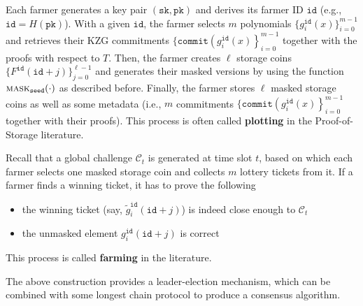 \documentclass[12pt,draftcls,onecolumn]{IEEEtran}
\newcommand{\sk}{\texttt{sk}}
\newcommand{\pk}{\texttt{pk}}
\newcommand{\id}{\texttt{id}}
\newcommand{\seed}{\texttt{seed}}
\newcommand{\cmt}{\texttt{commit}}
\newcommand{\mask}{\textsc{mask}}
\begin{document}
Each farmer generates a key pair $(\sk, \pk)$ and derives its farmer ID $\id$ (e.g., $\id = H(\pk)$).
With a given $\id$, the farmer selects $m$ polynomials $\{g_i^{\id}(x) \}_{i = 0}^{m - 1}$ and retrieves their KZG commitments $\{\cmt\left(g_i^{\id}(x) \right \}_{i = 0}^{m - 1}$
together with the proofs with respect to $T$. Then, the farmer creates $\ell$ storage coins 
$\{ F^{\id}(\id + j) \}_{j = 0}^{\ell - 1}$ and generates their masked versions by using the function $\mask_{\seed}(\cdot)$ as described before.
Finally, the farmer stores $\ell$ masked storage coins as well as some metadata (i.e., $m$ commitments $\{\cmt\left(g_i^{\id}(x) \right \}_{i = 0}^{m - 1}$ together with their proofs).
This process is often called {\bf plotting} in the Proof-of-Storage literature.

Recall that a global challenge $\mathcal{C}_t$ is generated at time slot $t$, based on which each farmer selects one masked storage coin and collects $m$ lottery tickets from it. If a farmer finds a winning ticket, it has to prove the following
\begin{itemize}
    \item the winning ticket (say, $\tilde{g}_i^{\id}(\id + j)$) is indeed close enough to $\mathcal{C}_t$
    \item the unmasked element ${g}_i^{\id}(\id + j)$ is correct
\end{itemize}
This process is called {\bf farming} in the literature. 

The above construction provides a leader-election mechanism, which can be combined with some longest chain protocol to produce a consensus algorithm.

\end{document}
